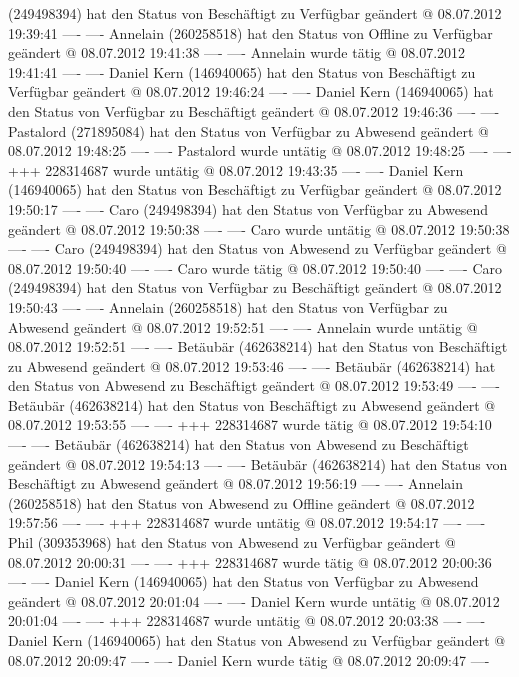  (249498394) hat den Status von Beschäftigt zu Verfügbar geändert @ 08.07.2012 19:39:41 ----
---- Annelain (260258518) hat den Status von Offline zu Verfügbar geändert @ 08.07.2012 19:41:38 ----
---- Annelain wurde tätig @ 08.07.2012 19:41:41 ----
---- Daniel  Kern (146940065) hat den Status von Beschäftigt zu Verfügbar geändert @ 08.07.2012 19:46:24 ----
---- Daniel  Kern (146940065) hat den Status von Verfügbar zu Beschäftigt geändert @ 08.07.2012 19:46:36 ----
---- Pastalord (271895084) hat den Status von Verfügbar zu Abwesend geändert @ 08.07.2012 19:48:25 ----
---- Pastalord wurde untätig @ 08.07.2012 19:48:25 ----
---- +++ 228314687 wurde untätig @ 08.07.2012 19:43:35 ----
---- Daniel  Kern (146940065) hat den Status von Beschäftigt zu Verfügbar geändert @ 08.07.2012 19:50:17 ----
---- Caro (249498394) hat den Status von Verfügbar zu Abwesend geändert @ 08.07.2012 19:50:38 ----
---- Caro wurde untätig @ 08.07.2012 19:50:38 ----
---- Caro (249498394) hat den Status von Abwesend zu Verfügbar geändert @ 08.07.2012 19:50:40 ----
---- Caro wurde tätig @ 08.07.2012 19:50:40 ----
---- Caro (249498394) hat den Status von Verfügbar zu Beschäftigt geändert @ 08.07.2012 19:50:43 ----
---- Annelain (260258518) hat den Status von Verfügbar zu Abwesend geändert @ 08.07.2012 19:52:51 ----
---- Annelain wurde untätig @ 08.07.2012 19:52:51 ----
---- Betäubär (462638214) hat den Status von Beschäftigt zu Abwesend geändert @ 08.07.2012 19:53:46 ----
---- Betäubär (462638214) hat den Status von Abwesend zu Beschäftigt geändert @ 08.07.2012 19:53:49 ----
---- Betäubär (462638214) hat den Status von Beschäftigt zu Abwesend geändert @ 08.07.2012 19:53:55 ----
---- +++ 228314687 wurde tätig @ 08.07.2012 19:54:10 ----
---- Betäubär (462638214) hat den Status von Abwesend zu Beschäftigt geändert @ 08.07.2012 19:54:13 ----
---- Betäubär (462638214) hat den Status von Beschäftigt zu Abwesend geändert @ 08.07.2012 19:56:19 ----
---- Annelain (260258518) hat den Status von Abwesend zu Offline geändert @ 08.07.2012 19:57:56 ----
---- +++ 228314687 wurde untätig @ 08.07.2012 19:54:17 ----
---- Phil (309353968) hat den Status von Abwesend zu Verfügbar geändert @ 08.07.2012 20:00:31 ----
---- +++ 228314687 wurde tätig @ 08.07.2012 20:00:36 ----
---- Daniel  Kern (146940065) hat den Status von Verfügbar zu Abwesend geändert @ 08.07.2012 20:01:04 ----
---- Daniel  Kern wurde untätig @ 08.07.2012 20:01:04 ----
---- +++ 228314687 wurde untätig @ 08.07.2012 20:03:38 ----
---- Daniel  Kern (146940065) hat den Status von Abwesend zu Verfügbar geändert @ 08.07.2012 20:09:47 ----
---- Daniel  Kern wurde tätig @ 08.07.2012 20:09:47 ----
